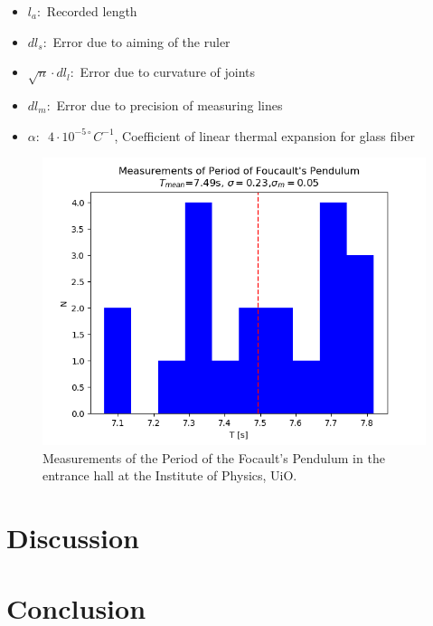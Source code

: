 \documentclass[%
 reprint,
 amsmath,amssymb,
 aps,
]{revtex4-1}
\begin{document}
  \begin{itemize}
    \item $l_a:$ Recorded length
    \item $dl_s:$ Error due to aiming of the ruler
    \item $\sqrt n \cdot dl_l:$ Error due to curvature of joints
    \item $dl_m:$ Error due to precision of measuring lines
    \item $\alpha :\enspace 4\cdot10^{-5\circ} C^{-1}$, Coefficient of linear thermal expansion for glass fiber
  \end{itemize}
  
  
  \begin{figure}[h!]
    \center
    \includegraphics[scale=0.6]{scripts/figs/period.png}
    \caption{Measurements of the Period of the Focault's Pendulum in the entrance hall at the Institute of Physics, UiO.}
    \label{fig:pendel}
  \end{figure}


\section{\label{sec:disc}Discussion}
\section{\label{sec:conc}Conclusion}


    
\end{document}
